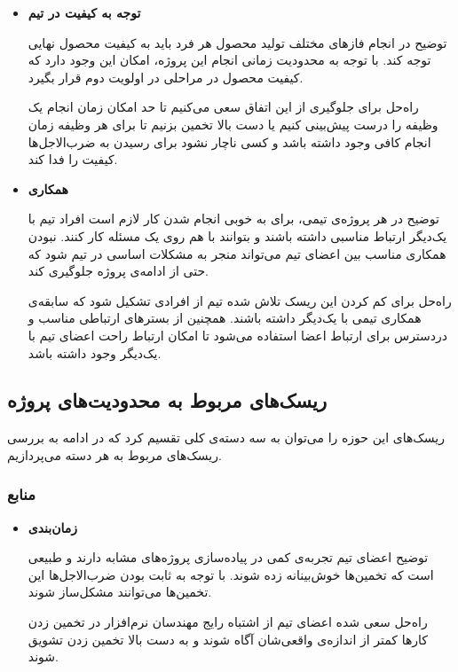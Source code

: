 \begin{itemize}
	
	\item 
	\textbf{توجه به کیفیت در تیم}

	توضیح \hspace*{1cm} 
در انجام فازهای مختلف تولید محصول هر فرد باید به کیفیت محصول نهایی توجه کند. با توجه به محدودیت زمانی انجام این پروژه، امکان این وجود دارد که کیفیت محصول در مراحلی در اولویت دوم قرار بگیرد.
	
	راه‌حل \hspace*{1cm} 
برای جلوگیری از این اتفاق سعی می‌کنیم تا حد امکان زمان انجام یک وظیفه را درست پیش‌بینی کنیم یا دست بالا تخمین بزنیم تا برای هر وظیفه زمان انجام کافی وجود داشته باشد و کسی ناچار نشود برای رسیدن به ضرب‌الاجل‌ها کیفیت را فدا کند.


\item 
\textbf{همکاری}

توضیح \hspace*{1cm} 
در هر پروژه‌ی تیمی، برای به خوبی انجام شدن کار لازم است افراد تیم با یک‌دیگر ارتباط مناسبی داشته باشند و بتوانند با هم روی یک مسئله کار کنند. نبودن همکاری مناسب بین اعضای تیم می‌تواند منجر به مشکلات اساسی در تیم شود که حتی از ادامه‌ی پروژه جلوگیری کند.

راه‌حل \hspace*{1cm} 
برای کم کردن این ریسک تلاش شده تیم از افرادی تشکیل شود که سابقه‌ی همکاری تیمی با یک‌دیگر داشته باشند. همچنین از بسترهای ارتباطی مناسب و دردسترس برای ارتباط اعضا استفاده می‌شود تا امکان ارتباط راحت اعضای تیم با یک‌دیگر وجود داشته باشد.

	
\end{itemize}

\subsection{ریسک‌های مربوط به محدودیت‌های پروژه}

ریسک‌های این حوزه را می‌توان به سه دسته‌ی کلی تقسیم کرد که در ادامه به بررسی ریسک‌های مربوط به هر دسته می‌پردازیم.

\subsubsection{منابع}

\begin{itemize}
	
	\item 
	\textbf{زمان‌بندی}

	توضیح \hspace*{1cm} 
اعضای تیم تجربه‌ی کمی در پیاده‌سازی پروژه‌های مشابه دارند و طبیعی است که تخمین‌ها خوش‌بینانه زده شوند.
با توجه به ثابت بودن ضرب‌الاجل‌ها این تخمین‌ها می‌توانند مشکل‌ساز شوند. 
	
	راه‌حل \hspace*{1cm} 
سعی شده اعضای تیم از اشتباه رایج مهندسان نرم‌افزار در تخمین زدن کارها کمتر از اندازه‌ی واقعی‌شان آگاه شوند و به دست بالا تخمین زدن تشویق شوند.
	
\end{itemize}

